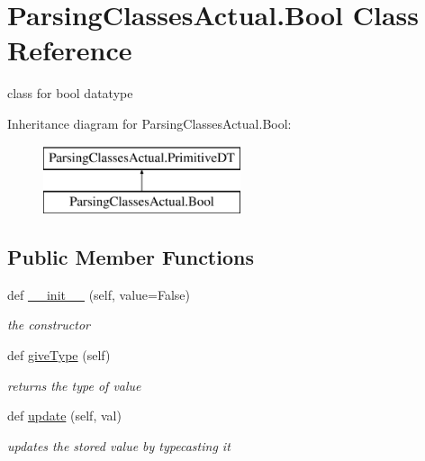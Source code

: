 \hypertarget{class_parsing_classes_actual_1_1_bool}{}\section{Parsing\+Classes\+Actual.\+Bool Class Reference}
\label{class_parsing_classes_actual_1_1_bool}


class for bool datatype  


Inheritance diagram for Parsing\+Classes\+Actual.\+Bool\+:\begin{figure}[H]
\begin{center}
\leavevmode
\includegraphics[height=2.000000cm]{class_parsing_classes_actual_1_1_bool}
\end{center}
\end{figure}
\subsection*{Public Member Functions}
\begin{DoxyCompactItemize}
\item 
def \hyperlink{class_parsing_classes_actual_1_1_bool_aff31c651efc789989951939a86fcc028}{\+\_\+\+\_\+init\+\_\+\+\_\+} (self, value=False)
\begin{DoxyCompactList}\small\item\em the constructor \end{DoxyCompactList}\item 
def \hyperlink{class_parsing_classes_actual_1_1_bool_a1fca505331a7ee21f805b4975058f2ee}{give\+Type} (self)\hypertarget{class_parsing_classes_actual_1_1_bool_a1fca505331a7ee21f805b4975058f2ee}{}\label{class_parsing_classes_actual_1_1_bool_a1fca505331a7ee21f805b4975058f2ee}

\begin{DoxyCompactList}\small\item\em returns the type of value \end{DoxyCompactList}\item 
def \hyperlink{class_parsing_classes_actual_1_1_bool_adde1b520ce9cc387ebefb158b984060b}{update} (self, val)\hypertarget{class_parsing_classes_actual_1_1_bool_adde1b520ce9cc387ebefb158b984060b}{}\label{class_parsing_classes_actual_1_1_bool_adde1b520ce9cc387ebefb158b984060b}

\begin{DoxyCompactList}\small\item\em updates the stored value by typecasting it \end{DoxyCompactList}\end{DoxyCompactItemize}
